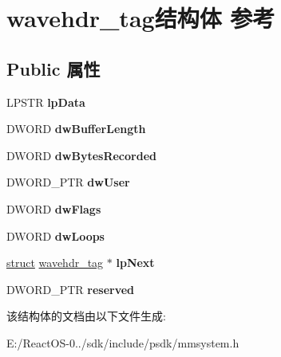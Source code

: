\hypertarget{structwavehdr__tag}{}\section{wavehdr\+\_\+tag结构体 参考}
\label{structwavehdr__tag}
\subsection*{Public 属性}
\begin{DoxyCompactItemize}
\item 
\mbox{\label{structwavehdr__tag_aa2f4876e79b66cdaafe41cb18d2bcff5}} 
L\+P\+S\+TR {\bfseries lp\+Data}
\item 
\mbox{\label{structwavehdr__tag_a21778de6b62754404ab7d92317d523be}} 
D\+W\+O\+RD {\bfseries dw\+Buffer\+Length}
\item 
\mbox{\label{structwavehdr__tag_a550c04c11d8d817823076b03da50b38a}} 
D\+W\+O\+RD {\bfseries dw\+Bytes\+Recorded}
\item 
\mbox{\label{structwavehdr__tag_a860fdfde75118dfd8f5a854ded0d1c39}} 
D\+W\+O\+R\+D\+\_\+\+P\+TR {\bfseries dw\+User}
\item 
\mbox{\label{structwavehdr__tag_a4493ecbc9ba392a1dab6d79f2403b1ee}} 
D\+W\+O\+RD {\bfseries dw\+Flags}
\item 
\mbox{\label{structwavehdr__tag_a369da88c45f20c6ef90d4edba9362fb2}} 
D\+W\+O\+RD {\bfseries dw\+Loops}
\item 
\mbox{\label{structwavehdr__tag_ae727285865e57e812bc683ec0bbb5c11}} 
\hyperlink{interfacestruct}{struct} \hyperlink{structwavehdr__tag}{wavehdr\+\_\+tag} $\ast$ {\bfseries lp\+Next}
\item 
\mbox{\label{structwavehdr__tag_ab0b9292e9ed2328e44f1889cd65e3549}} 
D\+W\+O\+R\+D\+\_\+\+P\+TR {\bfseries reserved}
\end{DoxyCompactItemize}


该结构体的文档由以下文件生成\+:\begin{DoxyCompactItemize}
\item 
E\+:/\+React\+O\+S-\/0../sdk/include/psdk/mmsystem.\+h\end{DoxyCompactItemize}
